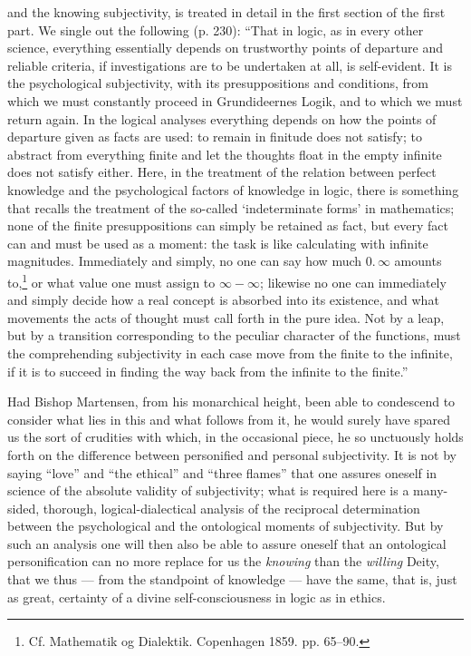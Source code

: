 \documentclass[12pt]{book}
\newcommand{\opage}[1]{\marginnote{\footnotesize\textit{[#1]}}}
\begin{document}
\opage{125}\setcounter{footnote}{0}%
and the knowing subjectivity, is treated in detail in the first section of the first part. We single out the following (p. 230): ``That in logic, as in every other science, everything essentially depends on trustworthy points of departure and reliable criteria, if investigations are to be undertaken at all, is self-evident. It is the psychological subjectivity, with its presuppositions and conditions, from which we must constantly proceed in Grundideernes Logik, and to which we must return again. In the logical analyses everything depends on how the points of departure given as facts are used: to remain in finitude does not satisfy; to abstract from everything finite and let the thoughts float in the empty infinite does not satisfy either. Here, in the treatment of the relation between perfect knowledge and the psychological factors of knowledge in logic, there is something that recalls the treatment of the so-called `indeterminate forms' in mathematics; none of the finite presuppositions can simply be retained as fact, but every fact can and must be used as a moment: the task is like calculating with infinite magnitudes. Immediately and simply, no one can say how much 0.\,$\infty$ amounts to,\footnote{Cf. Mathematik og Dialektik. Copenhagen 1859. pp. 65--90.} or what value one must assign to $\infty-\infty$; likewise no one can immediately and simply decide how a real concept is absorbed into its existence, and what movements the acts of thought must call forth in the pure idea. Not by a leap, but by a transition corresponding to the peculiar character of the functions, must the comprehending subjectivity in each case move from the finite to the infinite, if it is to succeed in finding the way back from the infinite to the finite.''

Had Bishop Martensen, from his monarchical height, been able to condescend to consider what lies in this and what follows from it, he would surely have spared us the sort of crudities
\opage{126}\setcounter{footnote}{0}%
with which, in the occasional piece, he so unctuously holds forth on the difference between personified and personal subjectivity. It is not by saying ``love'' and ``the ethical'' and ``three flames'' that one assures oneself in science of the absolute validity of subjectivity; what is required here is a many-sided, thorough, logical-dialectical analysis of the reciprocal determination between the psychological and the ontological moments of subjectivity. But by such an analysis one will then also be able to assure oneself that an ontological personification can no more replace for us the \emph{knowing} than the \emph{willing} Deity, that we thus --- from the standpoint of knowledge --- have the same, that is, just as great, certainty of a divine self-consciousness in logic as in ethics.
\end{document}
